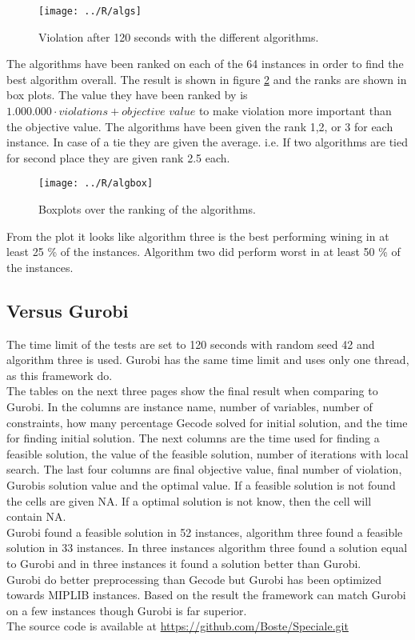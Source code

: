 \begin{figure}[!h]
\centerline{
\texttt{[image: ../R/algs]}} \caption{Violation after 120 seconds with the different 
algorithms.}\label{fig_algs}
\end{figure}\noindent
\newpage\noindent
The algorithms have been ranked on each of the 64 instances in order to find the best algorithm overall. The result is 
shown in figure \ref{fig_boxplot} and the ranks are shown in box plots. The value they have been ranked by is 
$1.000.000\cdot violations + objective$ $value$ to make violation more important than the objective value. The 
algorithms have been given the rank 1,2, or 3 for each instance. In case of a tie they are given the average. i.e. If 
two algorithms are tied for second place they are given rank 2.5 each. \\
\begin{figure}[!h]
\centering
\texttt{[image: ../R/algbox]} \caption{Boxplots over the ranking of the 
algorithms.}\label{fig_boxplot}
\end{figure}\noindent
From the plot it looks like algorithm three is the best performing wining in at least 25 \% of the instances. Algorithm 
two did perform worst in at least 50 \% of the instances. \\ 
\subsection{Versus Gurobi}
The time limit of the tests are set to 120 seconds with random seed 42 and algorithm three is used. Gurobi has the same 
time limit and uses only one thread, as this framework do. \\ 
The tables on the next three pages show the final result when comparing to Gurobi. In the columns are instance name, 
number of variables, number of constraints, how many percentage Gecode solved for initial solution, and the time for 
finding initial solution. The next columns are the time used for finding a feasible solution, the value of the feasible 
solution, number of iterations with local search. The last four columns are final objective value, final number of 
violation, Gurobis solution value and the optimal value. If a feasible solution is not found the cells are given NA. 
If a optimal solution is not know, then the cell will contain NA. \\ 
Gurobi found a feasible solution in 52 instances, algorithm three found a feasible solution in 33 instances. In three 
instances algorithm three found a solution equal to Gurobi and in three instances it found a solution better than 
Gurobi. \\
Gurobi do better preprocessing than Gecode but Gurobi has been optimized towards MIPLIB instances. Based on the result 
the framework can match Gurobi on a few instances though Gurobi is far superior. \\ 
The source code is available at \url{https://github.com/Boste/Speciale.git}


